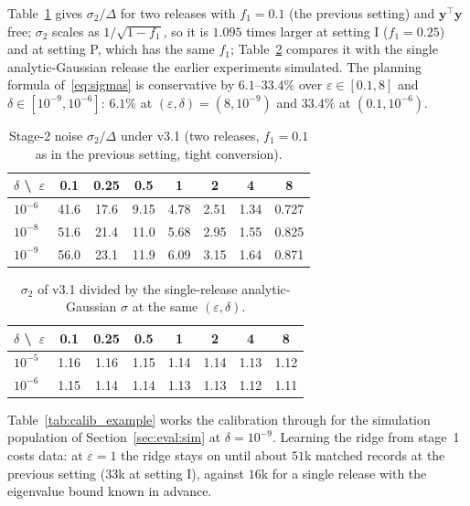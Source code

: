 \documentclass[11pt]{article}
\theoremstyle{definition}
\theoremstyle{plain}
\newcommand{\by}{\mathbf{y}}
\begin{document}
Table~\ref{tab:calib_sigma} gives $\sigma_2/\Delta$ for two releases with $f_1 = 0.1$ (the previous setting) and $\by^\top\by$ free; $\sigma_2$ scales as $1/\sqrt{1 - f_1}$, so it is $1.095$ times larger at setting I ($f_1 = 0.25$) and at setting P, which has the same $f_1$; Table~\ref{tab:calib_ratio} compares it with the single analytic-Gaussian release the earlier experiments simulated. The planning formula of~\eqref{eq:sigmas} is conservative by $6.1$--$33.4\%$ over $\varepsilon \in [0.1, 8]$ and $\delta \in [10^{-9}, 10^{-6}]$: $6.1\%$ at $(\varepsilon, \delta) = (8, 10^{-9})$ and $33.4\%$ at $(0.1, 10^{-6})$.

\begin{table}[ht]
  \centering\small
  \caption{Stage-2 noise $\sigma_2/\Delta$ under v3.1 (two releases, $f_1 = 0.1$ as in the previous setting, tight conversion).}
  \label{tab:calib_sigma}
  \begin{tabular}{@{}lccccccc@{}}
    \toprule
    $\delta$ \textbackslash\ $\varepsilon$ & 0.1 & 0.25 & 0.5 & 1 & 2 & 4 & 8 \\
    \midrule
    $10^{-6}$ & 41.6 & 17.6 & 9.15 & 4.78 & 2.51 & 1.34 & 0.727 \\
    $10^{-8}$ & 51.6 & 21.4 & 11.0 & 5.68 & 2.95 & 1.55 & 0.825 \\
    $10^{-9}$ & 56.0 & 23.1 & 11.9 & 6.09 & 3.15 & 1.64 & 0.871 \\
    \bottomrule
  \end{tabular}
\end{table}

\begin{table}[ht]
  \centering\small
  \caption{$\sigma_2$ of v3.1 divided by the single-release analytic-Gaussian $\sigma$ at the same $(\varepsilon, \delta)$.}
  \label{tab:calib_ratio}
  \begin{tabular}{@{}lccccccc@{}}
    \toprule
    $\delta$ \textbackslash\ $\varepsilon$ & 0.1 & 0.25 & 0.5 & 1 & 2 & 4 & 8 \\
    \midrule
    $10^{-5}$ & 1.16 & 1.16 & 1.15 & 1.14 & 1.14 & 1.13 & 1.12 \\
    $10^{-6}$ & 1.15 & 1.14 & 1.14 & 1.13 & 1.13 & 1.12 & 1.11 \\
    \bottomrule
  \end{tabular}
\end{table}

Table~\ref{tab:calib_example} works the calibration through for the simulation population of Section~\ref{sec:eval:sim} at $\delta = 10^{-9}$. Learning the ridge from stage~1 costs data: at $\varepsilon = 1$ the ridge stays on until about $51$k matched records at the previous setting ($33$k at setting I), against $16$k for a single release with the eigenvalue bound known in advance.
\end{document}
